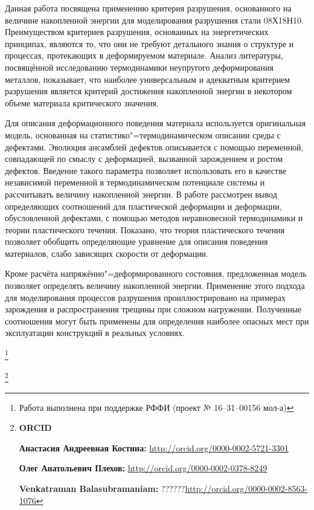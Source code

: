 \smallskip




Данная работа посвящена применению критерия разрушения, основанного на величине накопленной энергии для моделирования разрушения стали 08Х18Н10. Преимуществом критериев разрушения, основанных на энергетических принципах, являются то, что они не требуют детального знания о структуре и процессах, протекающих в деформируемом материале. Анализ литературы, посвящённой исследованию термодинамики неупругого деформирования металлов, показывает, что наиболее универсальным и адекватным критерием разрушения является критерий достижения накопленной энергии в некотором объеме материала критического значения.

Для описания деформационного поведения материала используется оригинальная модель, основанная на статистико"=термодинамическом описании среды с дефектами. Эволюция ансамблей дефектов описывается с помощью переменной, совпадающей по смыслу с деформацией, вызванной зарождением и ростом дефектов. Введение такого параметра позволяет использовать его в качестве независимой переменной в термодинамическом потенциале системы и рассчитывать величину накопленной энергии. В работе рассмотрен вывод определяющих соотношений для пластической деформации и деформации, обусловленной дефектами, с помощью методов неравновесной термодинамики и теории пластического течения. Показано, что теория пластического течения позволяет обобщить определяющие уравнение для описания поведения материалов, слабо зависящих скорости от деформации.

Кроме расчёта напряжённо"=деформированного состояния, предложенная модель позволяет определять величину накопленной энергии. Применение этого подхода для моделирования процессов разрушения проиллюстрировано на примерах зарождения и распространения трещины при сложном нагружении. Полученные соотношения могут быть применены для определения наиболее опасных мест при эксплуатации конструкций в реальных условиях.







{\thanks{Работа выполнена при поддержке РФФИ (проект № 16--31--00156 мол-а)}}



\thanks{{\bf ORCID}



{\bf Анастасия Андреевная Костина:}  \url{http://orcid.org/0000-0002-5721-3301}



{\bf Олег Анатольевич Плехов:}  \url{http://orcid.org/0000-0002-0378-8249}



{\bf Venkatraman Balasubramaniam:}    ??????\url{http://orcid.org/0000-0002-8563-1076}



}



